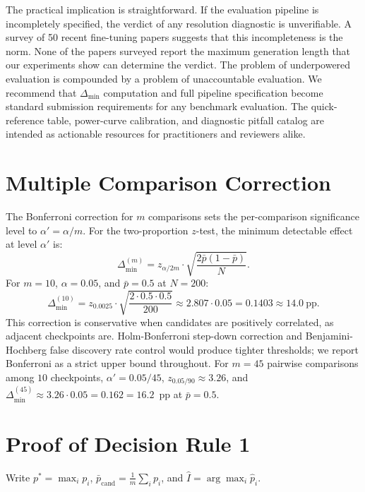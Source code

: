 \documentclass[pdflatex,sn-mathphys-ay,oneside]{sn-jnl}
\theoremstyle{thmstylethree}
\begin{document}
The practical implication is straightforward. If the evaluation pipeline is incompletely specified, the verdict of any resolution diagnostic is unverifiable. A survey of 50 recent fine-tuning papers suggests that this incompleteness is the norm. None of the papers surveyed report the maximum generation length that our experiments show can determine the verdict. The problem of underpowered evaluation is compounded by a problem of unaccountable evaluation. We recommend that $\Delta_{\min}$ computation and full pipeline specification become standard submission requirements for any benchmark evaluation. The quick-reference table, power-curve calibration, and diagnostic pitfall catalog are intended as actionable resources for practitioners and reviewers alike.

\appendix

\section{Multiple Comparison Correction}\label{app:proof}

The Bonferroni correction for $m$ comparisons sets the per-comparison significance level to $\alpha' = \alpha / m$. For the two-proportion $z$-test, the minimum detectable effect at level $\alpha'$ is:
\[
\Delta_{\min}^{(m)} = z_{\alpha/2m} \cdot \sqrt{\frac{2\bar{p}(1-\bar{p})}{N}}.
\]
For $m=10$, $\alpha=0.05$, and $\bar{p}=0.5$ at $N=200$:
\[
\Delta_{\min}^{(10)} = z_{0.0025} \cdot \sqrt{\frac{2 \cdot 0.5 \cdot 0.5}{200}} \approx 2.807 \cdot 0.05 = 0.1403 \approx 14.0\ \text{pp}.
\]
This correction is conservative when candidates are positively correlated, as adjacent checkpoints are. Holm-Bonferroni step-down correction and Benjamini-Hochberg false discovery rate control would produce tighter thresholds; we report Bonferroni as a strict upper bound throughout. For $m=45$ pairwise comparisons among $10$ checkpoints, $\alpha' = 0.05/45$, $z_{0.05/90} \approx 3.26$, and $\Delta_{\min}^{(45)} \approx 3.26 \cdot 0.05 = 0.162 = 16.2$~pp at $\bar{p}=0.5$.

\section{Proof of Decision Rule 1}\label{app:rule_proof}

Write $p^* = \max_i p_i$, $\bar p_{\mathrm{cand}} = \frac{1}{m}\sum_i p_i$, and $\hat I = \arg\max_i \hat p_i$.
\end{document}
